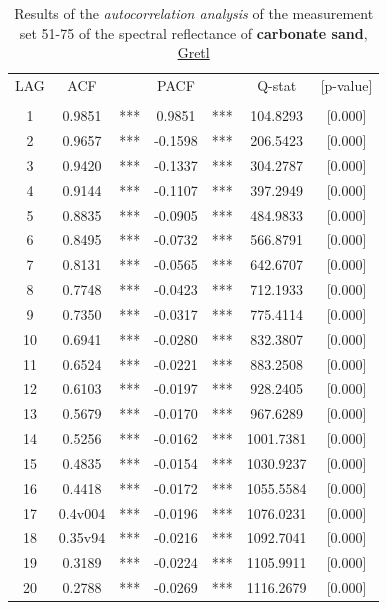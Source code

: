 \documentclass[10pt, a4paper]{article}
\begin{document}
\begin{appendices}
\begin{table}[htbp]
	\caption{Results of the \textit{autocorrelation analysis} of the measurement set 51-75 of the spectral reflectance of \textbf{carbonate sand}, \href{http://gretl.sourceforge.net/}{Gretl}}
	\begin{center}
	\begin{tabular}{|c c c c c c c||}
		\hline\hline
		LAG & ACF & & PACF & & Q-stat & [p-value] \\ \\ \hline\hline
		1  & 0.9851 & ***  & 0.9851& ***   & 104.8293 & [0.000]\\ \hline
		    2  & 0.9657  &***  &-0.1598  &   ***  &  206.5423  &[0.000]\\ \hline
		    3  & 0.9420  &***  &-0.1337  &  ***   &  304.2787  &[0.000]\\ \hline
		    4  & 0.9144  &***  &-0.1107  &  ***   &  397.2949  &[0.000]\\ \hline
		    5  & 0.8835  &***  &-0.0905  &  ***   &  484.9833  &[0.000]\\ \hline
		    6  & 0.8495 & ***  &-0.0732  &  ***   &  566.8791  &[0.000]\\ \hline
		    7  & 0.8131 & ***  &-0.0565  &  ***   &  642.6707  &[0.000]\\ \hline
		    8  & 0.7748 & ***  &-0.0423  &  ***   &  712.1933  &[0.000]\\ \hline
		    9  & 0.7350 & ***  &-0.0317  &  ***   &  775.4114  &[0.000]\\ \hline
		   10 &  0.6941&  *** & -0.0280 &  ***   &   832.3807 & [0.000]\\ \hline
		   11 &  0.6524 & *** & -0.0221 &  ***   &   883.2508 & [0.000]\\ \hline
		   12 &  0.6103 & *** & -0.0197 &  ***   &   928.2405 & [0.000]\\ \hline
		   13 &  0.5679 & *** & -0.0170 &  ***   &   967.6289 & [0.000]\\ \hline
		   14 &  0.5256 & *** & -0.0162 &  ***   &  1001.7381&  [0.000]\\ \hline
		   15 &  0.4835 & *** & -0.0154 &  ***   &  1030.9237 & [0.000]\\ \hline
		   16 & 0.4418 & *** & -0.0172  &  ***  &  1055.5584 & [0.000]\\ \hline
		   17  & 0.4v004 & *** & -0.0196 &***     &  1076.0231 & [0.000]\\ \hline
		   18 & 0.35v94 & *** & -0.0216  & ***   &  1092.7041 & [0.000]\\ \hline
		   19 &  0.3189 & *** & -0.0224   & ***  &  1105.9911 & [0.000]\\ \hline
		   20 &  0.2788 & *** & -0.0269   & ***  &  1116.2679 & [0.000]\\ \hline
	\end{tabular}
	\end{center}
	\label{tab:28}
\end{table}
\pagebreak


\end{appendices}
\end{document}
